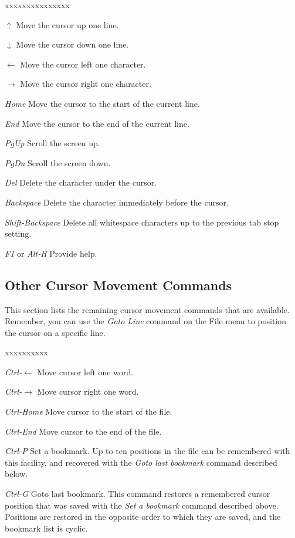 \begin{describe}{xxxxxxxxxxxxxxx}
\item[$\uparrow$]Move the cursor up one line.
\item[$\downarrow$]Move the cursor down one line.
\item[$\leftarrow$]Move the cursor left one character.
\item[$\rightarrow$]Move the cursor right one character.
\item[\em Home]Move the cursor to the start of the current line.
\item[\em End]Move the cursor to the end of the current line.
\item[\em PgUp]Scroll the screen up.
\item[\em PgDn]Scroll the screen down.
\item[\em Del]Delete the character under the cursor.
\item[\em Backspace]Delete the character immediately before the
cursor.
\item[\em Shift-Backspace]Delete all whitespace characters up to the
previous tab stop setting.
\item[{\em F1} or {\em Alt-H}]Provide help.
\end{describe}

\subsection[Other Cursor Movement Commands]{Other Cursor Movement Commands}

This section lists the remaining cursor movement commands that are
available. Remember, you can use the {\em Goto Line} command on the
File menu to position the cursor on a specific line.

\begin{describe}{xxxxxxxxxx}
\item[\em Ctrl-$\leftarrow$]Move cursor left one word.
\item[\em Ctrl-$\rightarrow$]Move cursor right one word.
\item[\em Ctrl-Home]Move cursor to the start of the file.
\item[\em Ctrl-End]Move cursor to the end of the file.
\item[\em Ctrl-P]Set a bookmark. Up to ten positions in the file can
be remembered with this facility, and recovered with the {\em Goto
last bookmark} command described below.
\item[\em Ctrl-G]Goto last bookmark. This command restores a
remembered cursor position that was saved with the {\em Set a
bookmark} command described above. Positions are restored in the
opposite order to which they are saved, and the bookmark list is
cyclic.
\end{describe}

